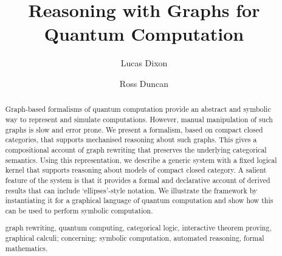 \documentclass[runningheads]{llncs}
\newcommand{\keywords}[1]{\par\addvspace\baselineskip
\noindent\keywordname\enspace\ignorespaces#1}
\begin{document}
\mainmatter  %

\title{Reasoning with Graphs for Quantum Computation}


%
%
\author{Lucas Dixon \and Ross Duncan}
%


%
%
\maketitle


\begin{abstract}
  Graph-based formalisms of quantum computation provide an
  abstract and symbolic way to represent and simulate computations.
  However, manual manipulation of such graphs is slow and error prone.
  We present a formalism, based on compact closed categories, that
  supports mechanised reasoning about such graphs. This gives a
  compositional account of graph rewriting that preserves the
  underlying categorical semantics. Using this representation, we
  describe a generic system with a fixed logical kernel that supports
  reasoning about models of compact closed category. A salient feature
  of the system is that it provides a formal and declarative account
  of derived results that can include `ellipses'-style notation. We
  illustrate the framework by instantiating it for a graphical
  language of quantum computation and show how this can be used to
  perform symbolic computation.

  \keywords{graph rewriting, quantum computing, categorical logic,
    interactive theorem proving, graphical calculi; concerning:
    symbolic computation, automated reasoning, formal mathematics.}
\end{abstract}
\end{document}
